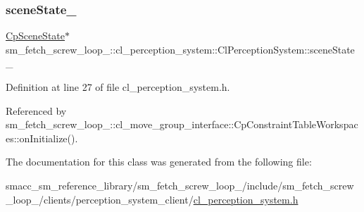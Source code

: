\subsubsection{\texorpdfstring{scene\+State\+\_\+}{sceneState\_}}
{\footnotesize\ttfamily \hyperlink{classsm__fetch__screw__loop__1_1_1cl__perception__system_1_1CpSceneState}{Cp\+Scene\+State}$\ast$ sm\+\_\+fetch\+\_\+screw\+\_\+loop\+\_\+::cl\+\_\+perception\+\_\+system\+::\+Cl\+Perception\+System\+::scene\+State\+\_\+}



Definition at line 27 of file cl\+\_\+perception\+\_\+system.\+h.



Referenced by sm\+\_\+fetch\+\_\+screw\+\_\+loop\+\_\+::cl\+\_\+move\+\_\+group\+\_\+interface\+::\+Cp\+Constraint\+Table\+Workspaces\+::on\+Initialize().



The documentation for this class was generated from the following file\+:\begin{DoxyCompactItemize}
\item 
smacc\+\_\+sm\+\_\+reference\+\_\+library/sm\+\_\+fetch\+\_\+screw\+\_\+loop\+\_/include/sm\+\_\+fetch\+\_\+screw\+\_\+loop\+\_/clients/perception\+\_\+system\+\_\+client/\hyperlink{sm__fetch__screw__loop__1_2include_2sm__fetch__screw__loop__1_2clients_2perception__system__client_2cl__perception__system_8h}{cl\+\_\+perception\+\_\+system.\+h}\end{DoxyCompactItemize}
